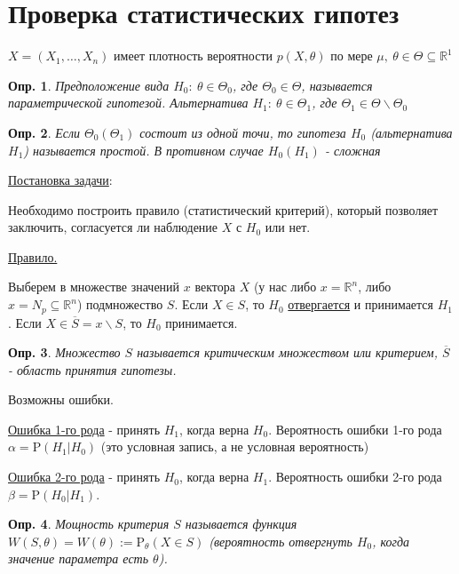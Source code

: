 \documentclass[12pt]{article}
\newtheorem{definition}{Опр.}
\theoremstyle{theorem}
\def\R{
    \mathbb{R}
}
\def\P{
    \mathrm{P}
}
\begin{document}
\section{Проверка статистических гипотез}
$X = (X_1, \ldots, X_n)$ имеет плотность вероятности $p(X, \theta)$
по мере $\mu,\ \theta\in\Theta\subseteq\R^1$

\begin{definition}
    Предположение вида $H_0: \ \theta\in\Theta_0$, где
    $\Theta_0\in\Theta$, называется параметрической гипотезой.
    Альтернатива $H_1: \ \theta\in\Theta_1$, где
    $\Theta_1\in\Theta\backslash\Theta_0$
\end{definition}

\begin{definition}
    Если $\Theta_0(\Theta_1)$ состоит из одной точи,
    то гипотеза $H_0$ (альтернатива $H_1$) называется
    простой.
    В противном случае $H_0(H_1)$ - сложная
\end{definition}

\underline{Постановка задачи}:

Необходимо построить правило (статистический критерий),
который позволяет заключить, согласуется ли наблюдение $X$
с $H_0$ или нет.

\underline{Правило.}

Выберем в множестве значений $x$ вектора $X$ (у нас либо
$x = \R^n$, либо $x = N_p \subseteq \R^n$) подмножество
$S$. Если $X \in S$, то $H_0$ \underline{отвергается} и
принимается $H_1$. Если $X \in \overline{S} = x \backslash S$, то
$H_0$ принимается.

\begin{definition}
    Множество $S$ называется критическим множеством или критерием,
    $\overline{S}$ - область принятия гипотезы.
\end{definition}

Возможны ошибки.

\underline{Ошибка 1-го рода} - принять $H_1$, когда
верна $H_0$. Вероятность ошибки 1-го рода $\alpha
 = \P(H_1 | H_0)$ (это условная запись, а не условная вероятность) 

\underline{Ошибка 2-го рода} - принять $H_0$, когда
верна $H_1$. Вероятность ошибки 2-го рода $\beta
= \P(H_0 | H_1)$.

\begin{definition}
    Мощность критерия $S$ называется функция $W(S, \theta) = W(\theta)
    := \P_\theta(X\in S)$ (вероятность отвергнуть $H_0$, когда
    значение параметра есть $\theta$).
\end{definition}
\end{document}
